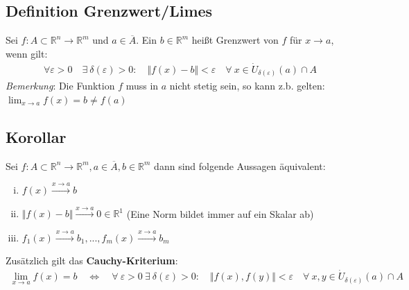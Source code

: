 \documentclass[11pt,a4paper]{book}
\newcommand {\R}	{\mathbb{R}}
\newcommand {\Rn}	{\mathbb{R}^n}
\newcommand {\Rm}	{\mathbb{R}^m}
\newcommand{\1}    	{\mathbbm{1}}
\begin{document}
\subsection{Definition Grenzwert/Limes}
Sei \(f : A \subset \Rn \rightarrow \Rm \) und \(a \in \overline{A}\). Ein \(b \in \Rm\) heißt Grenzwert von \(f\) für \(x \rightarrow a\), wenn gilt:
\begin{align*}
	\forall \varepsilon > 0 \quad \exists~ \delta(\varepsilon) > 0 : \quad \Vert f(x) - b \Vert < \varepsilon \quad \forall~ x \in \dot{U}_{\delta(\varepsilon)}(a) \cap A
\end{align*}
\textit{Bemerkung}: Die Funktion \(f\) muss in \(a\) nicht stetig sein, so kann z.b. gelten: \\
\( \lim_{x \rightarrow a} f(x) = b \neq f(a) \)

\subsection{Korollar}
Sei \(f : A \subset \Rn \rightarrow \Rm, a \in \overline{A}, b \in \Rm\) dann sind folgende Aussagen äquivalent:
\begin{enumerate}[(i)]
	\item \( f(x) \stackrel{x \rightarrow a}{\rightarrow} b \)
	\item \( \Vert f(x) - b \Vert \stackrel{x \rightarrow a}{\rightarrow} 0 \in \R^1 \) (Eine Norm bildet immer auf ein Skalar ab)
	\item \( f_1(x) \stackrel{x \rightarrow a}{\rightarrow} b_1, ..., f_m(x) \stackrel{x \rightarrow a}{\rightarrow} b_m \)
\end{enumerate}
Zusätzlich gilt das \textbf{Cauchy-Kriterium}:
\begin{align*}
	\lim_{x \rightarrow a} f(x) = b \quad \Leftrightarrow \quad \forall~ \varepsilon > 0 ~ \exists~ \delta(\varepsilon) > 0: \quad 
	\Vert f(x), f(y) \Vert < \varepsilon \quad \forall~ x,y \in \dot{U}_{\delta(\varepsilon)}(a) \cap A
\end{align*}
\end{document}

